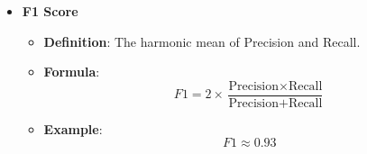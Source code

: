 \documentclass[aspectratio=169]{beamer}
\begin{document}
\begin{frame}[fragile]
\begin{itemize}
        \item \textbf{F1 Score}
            \begin{itemize}
                \item \textbf{Definition}: The harmonic mean of Precision and Recall.
                \item \textbf{Formula}:
                \begin{equation}
                F1 = 2 \times \frac{\text{Precision} \times \text{Recall}}{\text{Precision} + \text{Recall}}
                \end{equation}
                \item \textbf{Example}:
                \begin{equation}
                F1 \approx 0.93
                \end{equation}
            \end{itemize}
    \end{itemize}
\end{frame}
\end{document}
